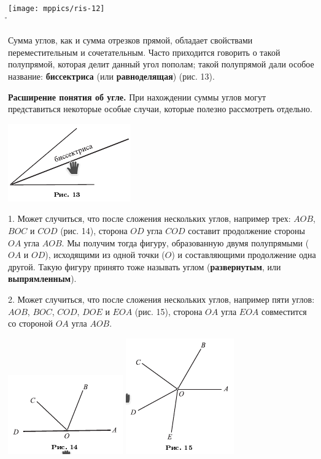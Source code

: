 \documentclass[oneside]{book}
\begin{document}
\begin{center}
	\texttt{[image: mppics/ris-12]}\\
	\r
\end{center}

Сумма углов, как и сумма отрезков прямой, обладает свойствами переместительным и сочетательным.
Часто приходится говорить о такой полупрямой, которая делит данный угол пополам;
такой полупрямой дали особое название:
\textbf{биссектриса} (или \textbf{равноделящая}) (рис. 13).


\textbf{Расширение понятия об угле.}
При нахождении суммы углов могут представиться некоторые особые случаи, которые полезно рассмотреть отдельно.

\includegraphics{pics/ris-13}

1.
Может случиться, что после сложения нескольких углов, например трех:
$AOB$, $BOC$ и $COD$ (рис. 14), сторона $OD$ угла $COD$ составит продолжение стороны $OA$ угла $AOB$.
Мы получим тогда фигуру, образованную двумя полупрямыми ($OA$ и $OD$), исходящими из одной точки ($O$) и составляющими продолжение одна другой.
Такую фигуру принято тоже называть углом (\textbf{развернутым}, или \textbf{выпрямленным}).

2.
Может случиться, что после сложения нескольких углов, например пяти углов:
$AOB$, $BOC$, $COD$, $DOE$ и $EOA$ (рис. 15), сторона $OA$ угла $EOA$ совместится со стороной $OA$ угла $AOB$.

\includegraphics{pics/ris-14}
\includegraphics{pics/ris-15}
\end{document}
